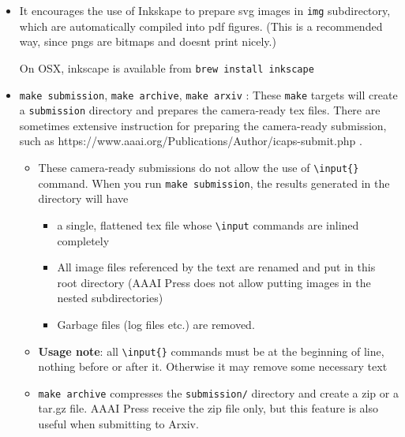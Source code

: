 \begin{itemize}
\item
  It encourages the use of Inkskape to
  prepare svg images in \texttt{img} subdirectory, which are
  automatically compiled into pdf figures. (This is a recommended way,
  since pngs are bitmaps and doesnt print nicely.)

  On OSX, inkscape is available from \texttt{brew\ install\ inkscape}
\item
  \texttt{make\ submission}, \texttt{make\ archive},
  \texttt{make\ arxiv} : These \texttt{make} targets will create a
  \texttt{submission} directory and prepares the camera-ready tex files.
  There are sometimes extensive instruction for preparing the
  camera-ready submission, such as
  https://www.aaai.org/Publications/Author/icaps-submit.php .

  \begin{itemize}
  
  \item
    These camera-ready submissions do not allow the use of
    \texttt{\textbackslash{}input\{\}} command. When you run
    \texttt{make\ submission}, the results generated in the directory
    will have

    \begin{itemize}
    
    \item
      a single, flattened tex file whose \texttt{\textbackslash{}input}
      commands are inlined completely
    \item
      All image files referenced by the text are renamed and put in this
      root directory (AAAI Press does not allow putting images in the
      nested subdirectories)
    \item
      Garbage files (log files etc.) are removed.
    \end{itemize}
  \item
    \textbf{Usage note}: all \texttt{\textbackslash{}input\{\}} commands
    must be at the beginning of line, nothing before or after it.
    Otherwise it may remove some necessary text
  \item
    \texttt{make\ archive} compresses the \texttt{submission/} directory
    and create a zip or a tar.gz file. AAAI Press receive the zip file
    only, but this feature is also useful when submitting to Arxiv.

    \begin{itemize}
    

\end{itemize}
\end{itemize}
\end{itemize}
